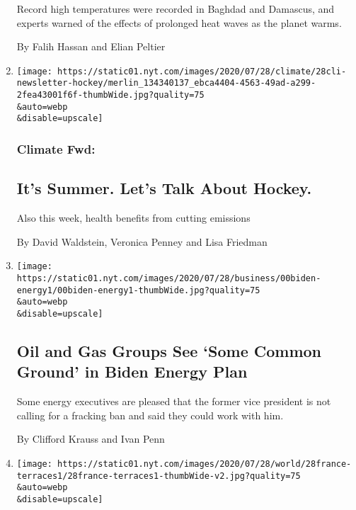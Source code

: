 \begin{enumerate}
  Record high temperatures were recorded in Baghdad and Damascus, and
  experts warned of the effects of prolonged heat waves as the planet
  warms.

  By Falih Hassan and Elian Peltier
\item
  \href{/2020/07/29/climate/skating-hockey-climate-change.html}{}

  \texttt{[image: https://static01.nyt.com/images/2020/07/28/climate/28cli-newsletter-hockey/merlin\_134340137\_ebca4404-4563-49ad-a299-2fea43001f6f-thumbWide.jpg?quality=75\\\&auto=webp\\\&disable=upscale]}

  \hypertarget{climate-fwd}{%
  \subsubsection{Climate Fwd:}\label{climate-fwd}}

  \hypertarget{its-summer-lets-talk-about-hockey}{%
  \subsection{It's Summer. Let's Talk About
  Hockey.}\label{its-summer-lets-talk-about-hockey}}

  Also this week, health benefits from cutting emissions

  By David Waldstein, Veronica Penney and Lisa Friedman
\item
  \href{/2020/07/28/business/energy-environment/joe-biden-oil-gas-energy.html}{}

  \texttt{[image: https://static01.nyt.com/images/2020/07/28/business/00biden-energy1/00biden-energy1-thumbWide.jpg?quality=75\\\&auto=webp\\\&disable=upscale]}

  \hypertarget{oil-and-gas-groups-see-some-common-ground-in-biden-energy-plan}{%
  \subsection{Oil and Gas Groups See `Some Common Ground' in Biden
  Energy
  Plan}\label{oil-and-gas-groups-see-some-common-ground-in-biden-energy-plan}}

  Some energy executives are pleased that the former vice president is
  not calling for a fracking ban and said they could work with him.

  By Clifford Krauss and Ivan Penn
\item
  \href{/2020/07/28/world/europe/france-heated-terraces-coronavirus.html}{}

  \texttt{[image: https://static01.nyt.com/images/2020/07/28/world/28france-terraces1/28france-terraces1-thumbWide-v2.jpg?quality=75\\\&auto=webp\\\&disable=upscale]}


\end{enumerate}
